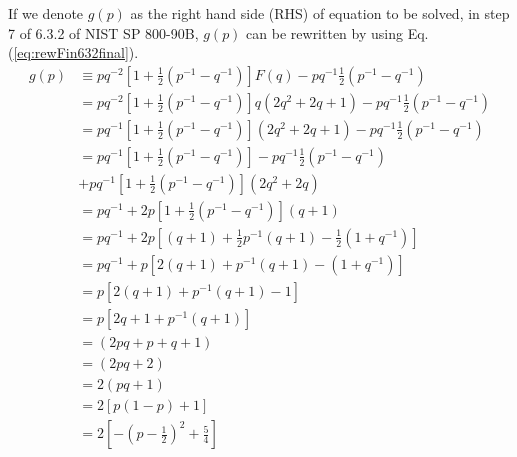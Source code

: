 ﻿\documentclass[a4paper,xelatex,english]{bxjsarticle}
\begin{document}
If we denote $g(p)$ as the right hand side (RHS) of equation to be solved, in step 7 of 6.3.2 of NIST SP 800-90B\cite{SP80090B}, $g(p)$ can be rewritten by using Eq.(\ref{eq:rewFin632final}).
\begin{align}
g(p) & \equiv  p q^{-2} \left[ 1 + \frac{1}{2}(p^{-1} - q^{-1}) \right]F(q) - p q^{-1} \frac{1}{2}(p^{-1} - q^{-1}) \nonumber \\
&= p q^{-2} \left[ 1 + \frac{1}{2}(p^{-1} - q^{-1}) \right]q \left( 2q^{2} + 2q + 1 \right) - p q^{-1} \frac{1}{2}(p^{-1} - q^{-1}) \nonumber \\
&= p q^{-1} \left[ 1 + \frac{1}{2}(p^{-1} - q^{-1}) \right]  \left( 2q^{2} + 2q + 1 \right) - p q^{-1} \frac{1}{2}(p^{-1} - q^{-1}) \nonumber \\
&= p q^{-1} \left[ 1 + \frac{1}{2}(p^{-1} - q^{-1}) \right] - p q^{-1} \frac{1}{2}(p^{-1} - q^{-1}) \nonumber \\
&+ p q^{-1} \left[ 1 + \frac{1}{2}(p^{-1} - q^{-1}) \right] \left( 2q^{2} + 2q \right) \nonumber \\
&= p q^{-1} 
 + 2 p \left[ 1 + \frac{1}{2}(p^{-1} - q^{-1}) \right] \left( q + 1 \right) \nonumber \\
&= p q^{-1} 
 + 2 p \left[ (q + 1) + \frac{1}{2}p^{-1}(q + 1) - \frac{1}{2}(1 + q^{-1}) \right] \nonumber \\
&= p q^{-1} 
 + p \left[ 2(q + 1) + p^{-1}(q + 1) - (1 + q^{-1}) \right] \nonumber \\
&= p \left[ 2(q + 1) + p^{-1}(q + 1) - 1 \right] \nonumber \\
&= p \left[ 2q + 1 + p^{-1}(q + 1) \right] \nonumber \\
&= \left( 2pq + p + q + 1 \right) \nonumber \\
&= \left( 2pq + 2 \right) \nonumber \\
&= 2( pq + 1) \nonumber \\
&= 2 \left[ p(1 - p) + 1 \right] \nonumber \\
&= 2 \left[ -\left(p - \frac{1}{2}\right)^{2} + \frac{5}{4} \right] \label{eq:rhs632}
\end{align}
\end{document}
